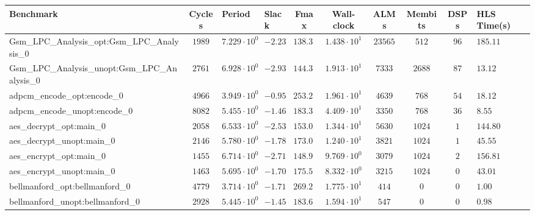 \begin{tabular}{|l|c|HHc|c|c|c|cH|}
\hline
Benchmark                                       & Cycles       & Period                 & Slack     & Fmax       & Wall-clock              & ALMs       & Membits     & DSPs    & HLS Time(s) \\
\hline
Gsm\_LPC\_Analysis\_opt:Gsm\_LPC\_Analysis\_0   & $ 1989     $ & $ 7.229 \cdot 10^{0} $ & $ -2.23 $ & $ 138.33 $ & $ 1.438 \cdot 10^{1}  $ & $ 23565  $ & $ 512     $ & $ 96  $ & $ 185.11  $ \\
Gsm\_LPC\_Analysis\_unopt:Gsm\_LPC\_Analysis\_0 & $ 2761     $ & $ 6.928 \cdot 10^{0} $ & $ -2.93 $ & $ 144.34 $ & $ 1.913 \cdot 10^{1}  $ & $ 7333   $ & $ 2688    $ & $ 87  $ & $ 13.12   $ \\
adpcm\_encode\_opt:encode\_0                    & $ 4966     $ & $ 3.949 \cdot 10^{0} $ & $ -0.95 $ & $ 253.23 $ & $ 1.961 \cdot 10^{1}  $ & $ 4639   $ & $ 768     $ & $ 54  $ & $ 18.12   $ \\
adpcm\_encode\_unopt:encode\_0                  & $ 8082     $ & $ 5.455 \cdot 10^{0} $ & $ -1.46 $ & $ 183.32 $ & $ 4.409 \cdot 10^{1}  $ & $ 3350   $ & $ 768     $ & $ 36  $ & $ 8.55    $ \\
aes\_decrypt\_opt:main\_0                       & $ 2058     $ & $ 6.533 \cdot 10^{0} $ & $ -2.53 $ & $ 153.07 $ & $ 1.344 \cdot 10^{1}  $ & $ 5630   $ & $ 1024    $ & $ 1   $ & $ 144.80  $ \\
aes\_decrypt\_unopt:main\_0                     & $ 2146     $ & $ 5.780 \cdot 10^{0} $ & $ -1.78 $ & $ 173.01 $ & $ 1.240 \cdot 10^{1}  $ & $ 3821   $ & $ 1024    $ & $ 1   $ & $ 45.55   $ \\
aes\_encrypt\_opt:main\_0                       & $ 1455     $ & $ 6.714 \cdot 10^{0} $ & $ -2.71 $ & $ 148.94 $ & $ 9.769 \cdot 10^{0}  $ & $ 3079   $ & $ 1024    $ & $ 2   $ & $ 156.81  $ \\
aes\_encrypt\_unopt:main\_0                     & $ 1463     $ & $ 5.695 \cdot 10^{0} $ & $ -1.70 $ & $ 175.59 $ & $ 8.332 \cdot 10^{0}  $ & $ 3215   $ & $ 1024    $ & $ 0   $ & $ 43.01   $ \\
bellmanford\_opt:bellmanford\_0                 & $ 4779     $ & $ 3.714 \cdot 10^{0} $ & $ -1.71 $ & $ 269.25 $ & $ 1.775 \cdot 10^{1}  $ & $ 414    $ & $ 0       $ & $ 0   $ & $ 1.00    $ \\
bellmanford\_unopt:bellmanford\_0               & $ 2928     $ & $ 5.445 \cdot 10^{0} $ & $ -1.45 $ & $ 183.65 $ & $ 1.594 \cdot 10^{1}  $ & $ 547    $ & $ 0       $ & $ 0   $ & $ 0.98    $ \\

\end{tabular}
